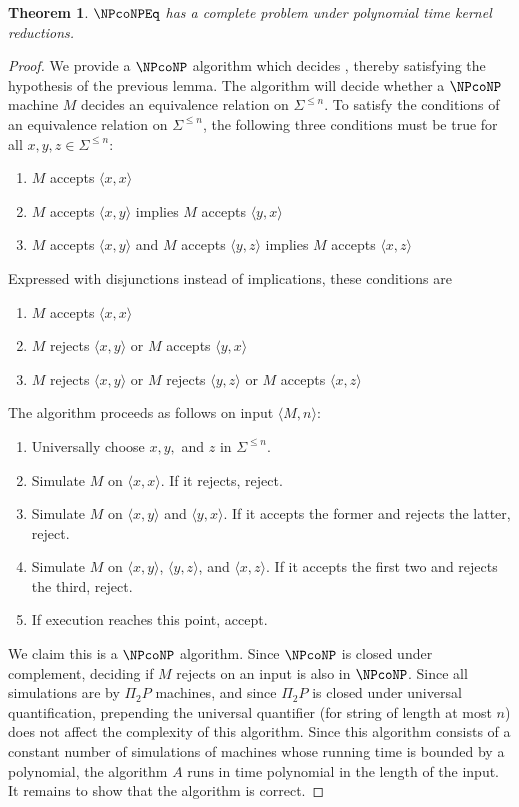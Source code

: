 \documentclass[draft]{article}
\newtheorem{theorem}{Theorem}[section]
\theoremstyle{definition} \newtheorem{openproblem}[openproblem]{Open problem}
\theoremstyle{definition} \newtheorem{definition}[definition]{Definition}
\theoremstyle{remark} \newtheorem{remark}[remark]{Remark}
\newcommand{\pair}[2]{\langle#1,#2\rangle} %
\begin{document}
\begin{theorem}\label{thm:completeproblem}
  $\NPcoNPEq$ has a complete problem under polynomial time kernel reductions.
\end{theorem}
\begin{proof}
  We provide a $\NPcoNP$ algorithm which decides , thereby satisfying the hypothesis of the previous lemma.
  The algorithm will decide whether a $\NPcoNP$ machine $M$ decides an equivalence relation on $\Sigma^{\leq n}$.
  To satisfy the conditions of an equivalence relation on $\Sigma^{\leq n}$, the following three conditions must be true for all $x,y,z\in\Sigma^{\leq n}$:
  \begin{enumerate}
  \item $M$ accepts $\pair{x}{x}$
  \item $M$ accepts $\pair{x}{y}$ implies $M$ accepts $\pair{y}{x}$
  \item $M$ accepts $\pair{x}{y}$ and $M$ accepts $\pair{y}{z}$ implies $M$ accepts $\pair{x}{z}$
  \end{enumerate}
  Expressed with disjunctions instead of implications, these conditions are
  \begin{enumerate}
  \item $M$ accepts $\pair{x}{x}$
  \item $M$ rejects $\pair{x}{y}$ or $M$ accepts $\pair{y}{x}$
  \item $M$ rejects $\pair{x}{y}$ or $M$ rejects $\pair{y}{z}$ or $M$ accepts $\pair{x}{z}$
  \end{enumerate}
  The algorithm proceeds as follows on input $\pair{M}{n}$:
  \begin{enumerate}
  \item Universally choose $x,y,$ and $z$ in $\Sigma^{\leq n}$.
  \item Simulate $M$ on $\pair{x}{x}$.
    If it rejects, reject.
  \item Simulate $M$ on $\pair{x}{y}$ and $\pair{y}{x}$.
    If it accepts the former and rejects the latter, reject.
  \item Simulate $M$ on $\pair{x}{y}$, $\pair{y}{z}$, and $\pair{x}{z}$.
    If it accepts the first two and rejects the third, reject.
  \item If execution reaches this point, accept.
  \end{enumerate}

  We claim this is a $\NPcoNP$ algorithm.
  Since $\NPcoNP$ is closed under complement, deciding if $M$ rejects on an input is also in $\NPcoNP$.
  Since all simulations are by $\Pi_2P$ machines, and since $\Pi_2P$ is closed under universal quantification, prepending the universal quantifier (for string of length at most $n$) does not affect the complexity of this algorithm.
  Since this algorithm consists of a constant number of simulations of machines whose running time is bounded by a polynomial, the algorithm $A$ runs in time polynomial in the length of the input.
  It remains to show that the algorithm is correct.


\end{proof}
\end{document}
